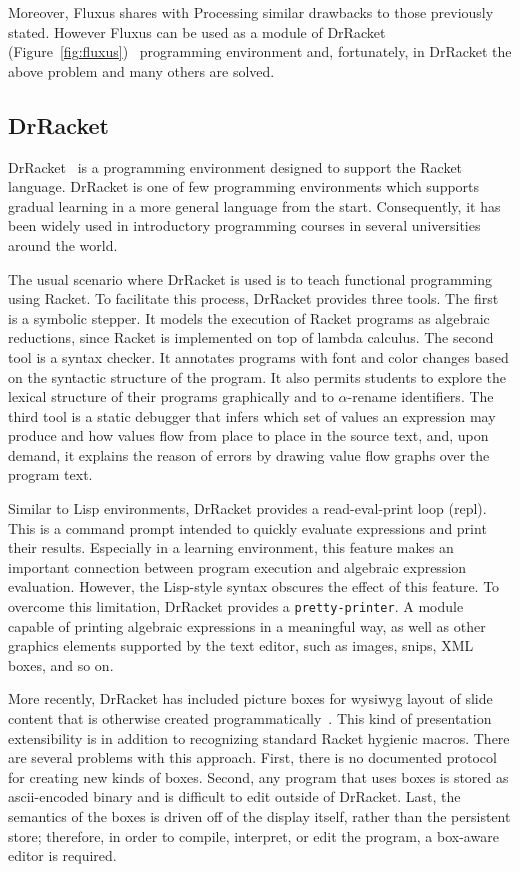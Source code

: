 Moreover, Fluxus shares with Processing similar drawbacks to those previously stated. However Fluxus can be used as a module of DrRacket (Figure~\ref{fig:fluxus})~\citep{findler2002drscheme} programming environment and, fortunately, in DrRacket the above problem and many others are solved.
\subsection{DrRacket}
\label{subsec:drracket}
DrRacket~\citep{findler2002drscheme} is a programming environment designed to support the Racket language. DrRacket is one of few programming environments which supports gradual learning in a more general language from the start. Consequently, it has been widely used in introductory programming courses in several universities around the world.

The usual scenario where DrRacket is used is to teach functional programming using Racket. To facilitate this process, DrRacket provides three tools. The first is a symbolic stepper. It models the execution of Racket programs as algebraic reductions, since Racket is implemented on top of lambda calculus. The second tool is a syntax checker. It annotates programs with font and color changes based on the syntactic structure of the program. It also permits students to explore the lexical structure of their programs graphically and to $\alpha$-rename identifiers. The third tool is a static debugger that infers which set of values an expression may produce and how values flow from place to place in the source text, and, upon demand, it explains the reason of errors by drawing value flow graphs over the program text.

Similar to Lisp environments, DrRacket provides a read-eval-print loop (\gls{repl}). This is a command prompt intended to quickly evaluate expressions and print their results. Especially in a learning environment, this feature makes an important connection between program execution and algebraic expression evaluation. However, the Lisp-style syntax obscures the effect of this feature. To overcome this limitation, DrRacket provides a \texttt{pretty-printer}. A module capable of printing algebraic expressions in a meaningful way, as well as other graphics elements supported by the text editor, such as images, snips, XML boxes, and so on.

More recently, DrRacket has included picture boxes for \gls{wysiwyg} layout of slide content that is otherwise created programmatically~\citep{findler2004slideshow}. This kind of presentation extensibility is in addition to recognizing standard Racket hygienic macros. There are several problems with this approach. First, there is no documented protocol for creating new kinds of boxes. Second, any program that uses boxes is stored as ascii-encoded binary and is difficult to edit outside of DrRacket. Last, the semantics of the boxes is driven off of the display itself, rather than the persistent store; therefore, in order to compile, interpret, or edit the program, a box-aware editor is required.

